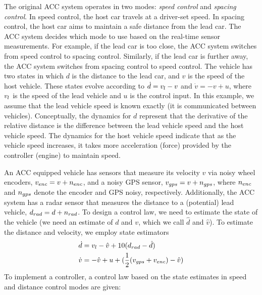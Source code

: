 %
%
The original ACC system operates in two modes: \emph{speed control} and \emph{spacing control}. In speed control, the host car travels at a driver-set speed. In spacing control, the host car aims to maintain a safe distance from the lead car.
%
The ACC system decides which mode to use based on the real-time sensor measurements.
%
For example, if the lead car is too close, the ACC system switches from speed control to spacing control.
%
Similarly, if the lead car is further away, the ACC system switches from spacing control to speed control. %
%
The vehicle has two states in which $d$ is the distance to the lead car, and $v$ is the speed of the host vehicle. These states evolve according to $\dot{d} = v_{l} - v$ and $\dot{v} = -v + u$, 
%
where $v_{l}$ is the speed of the lead vehicle  and $u$ is the control input.  In this example, we assume that the lead vehicle speed is known exactly (\eg it is communicated between vehicles). Conceptually, the dynamics for $d$ represent that the derivative of the relative distance is the difference between the lead vehicle speed and the host vehicle speed. The dynamics for the host vehicle speed indicate that as the vehicle speed increases, it takes more acceleration (\ie force) provided by the controller (\ie engine) to maintain speed.

An ACC equipped vehicle has sensors that measure its velocity $v$ via noisy wheel encoders, $v_{enc} = v + n_{enc}$, and a noisy GPS sensor, $v_{gps} = v+n_{gps}$, where $n_{enc}$ and $n_{gps}$ denote the encoder and GPS noisy, respectively.
%
%
Additionally, the ACC system has a radar sensor that measures the distance to a (potential) lead vehicle, $d_{rad} = d+n_{rad}$.
%
To design a control law, we need to estimate the state of the vehicle (\ie we need an estimate of $d$ and $v$, which we call $\hat{d}$ and $\hat{v}$). To estimate the distance and velocity, we employ state estimators
%
\begin{align}
\dot{d} & = v_{l} - \hat{v} + 10(d_{rad} - \hat{d}) \nonumber \\
\dot{v} & = -\hat{v} + u +  (\frac{1}{2} (v_{gps} + v_{enc}) - \hat{v})
\end{align}
%
%
To implement a controller, a control law based on the state estimates in speed and distance control modes are given:

